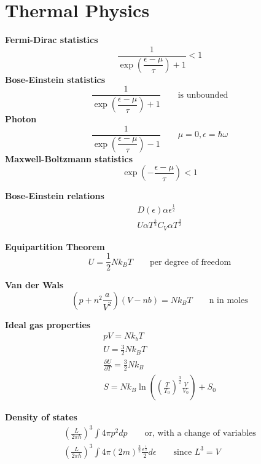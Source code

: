 \documentclass{article}
\begin{document}
\section{Thermal Physics} %
{\bf Fermi-Dirac statistics}
\begin{equation}
  \dfrac{1}{\exp\left({\dfrac{\epsilon-\mu}{\tau}}\right)+1} < 1
\end{equation}
{\bf Bose-Einstein statistics}
\begin{equation}
  \dfrac{1}{\exp\left({\dfrac{\epsilon-\mu}{\tau}}\right)+1} \qquad \textrm{is unbounded}
\end{equation}
{\bf Photon}
\begin{equation}
  \dfrac{1}{\exp\left({\dfrac{\epsilon-\mu}{\tau}}\right)-1} \qquad \mu=0, \epsilon=\hbar\omega
\end{equation}
{\bf Maxwell-Boltzmann statistics}
\begin{equation}
  \exp{\left(-\frac{\epsilon-\mu}{\tau}\right)} < 1
\end{equation}

{\bf Bose-Einstein relations}
\begin{gather}
  D(\epsilon) \alpha \epsilon^{\frac{1}{2}} \\
  U \alpha T^{\frac{5}{2}}
  C_V \alpha T^{\frac{3}{2}}
\end{gather}
  
{\bf Equipartition Theorem}
\begin{equation}
  U = \frac{1}{2}Nk_{B}T \qquad \textrm{per degree of freedom}
\end{equation}

{\bf Van der Wals}
\begin{equation}
  \left(p + n^2\frac{a}{V^2}\right)\left(V-nb\right) = Nk_BT \qquad \textrm{n in moles}
\end{equation}

{\bf Ideal gas properties} %
\begin{gather}
  pV = Nk_bT \\
  U = \frac{3}{2}Nk_BT \\
  \frac{\partial U}{\partial T} = \frac{3}{2}Nk_B \\
  S = Nk_B\ln\left(\left(\frac{T}{T_0}\right)^{\frac{3}{2}}\frac{V}{V_0}\right) + S_0
\end{gather}

{\bf Density of states}
\begin{gather}
  \left(\frac{L}{2\pi\hbar}\right)^3\int 4\pi p^2 dp \qquad \textrm{or, with a change of variables} \\
  \left(\frac{L}{2\pi\hbar}\right)^3\int 4\pi \left(2m\right)^{\frac{3}{2}}\frac{\epsilon^{\frac{1}{2}}}{2} d\epsilon \qquad \textrm{since $L^3 = V$}
\end{gather}
\end{document}
